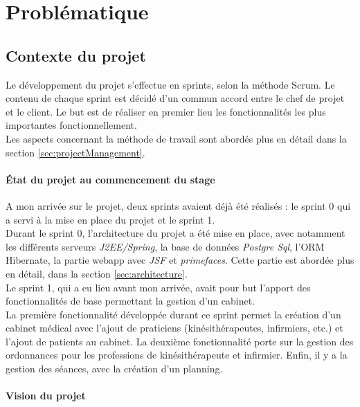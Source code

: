 \newpage
\section{Problématique}\label{sec:pb} %

\subsection{Contexte du projet}
Le développement du projet s'effectue en sprints, selon la méthode Scrum. Le contenu de chaque sprint est décidé d'un commun accord entre le chef de projet et le client. Le but est de réaliser en premier lieu les fonctionnalités les plus importantes fonctionnellement.\\
Les aspects concernant la méthode de travail sont abordés plus en détail dans la section \ref{sec:projectManagement}.

\paragraph*{État du projet au commencement du stage\\}
A mon arrivée sur le projet, deux sprints avaient déjà été réalisés : le sprint 0 qui a servi à la mise en place du projet et le sprint 1.\\

Durant le sprint 0, l'architecture du projet a été mise en place, avec notamment les différents serveurs \textit{J2EE/Spring}, la base de données \textit{Postgre Sql}, l'\gls{ORM} Hibernate, la partie webapp avec \textit{JSF} et \textit{primefaces}.
Cette partie est abordée plus en détail, dans la section \ref{sec:architecture}.\\

Le sprint 1, qui a eu lieu avant mon arrivée, avait pour but l'apport des fonctionnalités de base permettant la gestion d'un cabinet.\\
La première fonctionnalité développée durant ce sprint permet la création d'un cabinet médical avec l'ajout de praticiens (kinésithérapeutes, infirmiers, etc.) et l'ajout de patients au cabinet.
La deuxième fonctionnalité porte sur la gestion des ordonnances pour les professions de kinésithérapeute et infirmier. Enfin, il y a la gestion des séances, avec la création d'un planning.

\paragraph*{Vision du projet\\}

